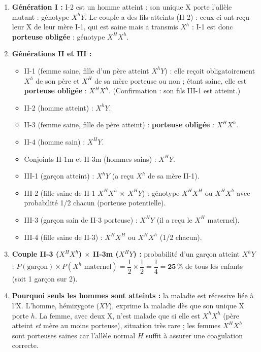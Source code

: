 \documentclass[11pt]{article}
\begin{document}
\begin{corrige}
\begin{enumerate}
    \item \textbf{Génération I :} I-2 est un homme atteint : son unique X porte l'allèle mutant : génotype $X^h Y$. Le couple a des fils atteints (II-2) : ceux-ci ont reçu leur X de leur mère I-1, qui est saine mais a transmis $X^h$ : I-1 est donc \textbf{porteuse obligée} : génotype $X^H X^h$.
    \item \textbf{Générations II et III :}
    \begin{itemize}
        \item II-1 (femme saine, fille d'un père atteint $X^h Y$) : elle reçoit obligatoirement $X^h$ de son père et $X^H$ de sa mère porteuse ou non ; étant saine, elle est \textbf{porteuse obligée} : $X^H X^h$. (Confirmation : son fils III-1 est atteint.)
        \item II-2 (homme atteint) : $X^h Y$.
        \item II-3 (femme saine, fille de père atteint) : \textbf{porteuse obligée} : $X^H X^h$.
        \item II-4 (homme sain) : $X^H Y$.
        \item Conjoints II-1m et II-3m (hommes sains) : $X^H Y$.
        \item III-1 (garçon atteint) : $X^h Y$ (a reçu $X^h$ de sa mère II-1).
        \item III-2 (fille saine de II-1 $X^H X^h$ $\times$ $X^H Y$) : génotype $X^H X^H$ ou $X^H X^h$ avec probabilité 1/2 chacun (porteuse potentielle).
        \item III-3 (garçon sain de II-3 porteuse) : $X^H Y$ (il a reçu le $X^H$ maternel).
        \item III-4 (fille saine de II-3) : $X^H X^H$ ou $X^H X^h$ (1/2 chacun).
    \end{itemize}
    \item \textbf{Couple II-3 ($X^H X^h$) $\times$ II-3m ($X^H Y$) :} probabilité d'un garçon atteint $X^h Y$ : $P(\text{garçon}) \times P(X^h \text{ maternel}) = \dfrac{1}{2} \times \dfrac{1}{2} = \dfrac{1}{4} = \mathbf{25\,\%}$ de tous les enfants (soit 1 garçon sur 2).
    \item \textbf{Pourquoi seuls les hommes sont atteints :} la maladie est récessive liée à l'X. L'homme, hémizygote ($XY$), exprime la maladie dès que son unique X porte $h$. La femme, avec deux X, n'est malade que si elle est $X^h X^h$ (père atteint \emph{et} mère au moins porteuse), situation très rare ; les femmes $X^H X^h$ sont porteuses saines car l'allèle normal $H$ suffit à assurer une coagulation correcte.

\end{enumerate}
\end{corrige}
\end{document}
